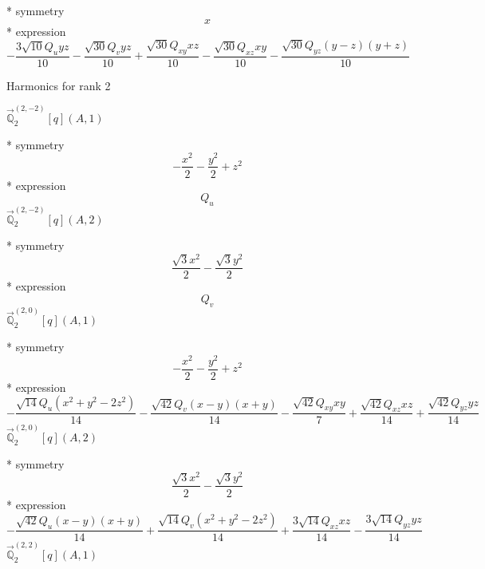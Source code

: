 \documentclass[fleqn,8pt]{jsarticle}
\begin{document}
\noindent\quad ** symmetry
\begin{dmath*}
x
\end{dmath*}
\noindent\quad ** expression
\begin{dmath*}
- \frac{3 \sqrt{10} Q_{u} y z}{10} - \frac{\sqrt{30} Q_{v} y z}{10} + \frac{\sqrt{30} Q_{xy} x z}{10} - \frac{\sqrt{30} Q_{xz} x y}{10} - \frac{\sqrt{30} Q_{yz} \left(y - z\right) \left(y + z\right)}{10}
\end{dmath*}

\noindent * Harmonics for rank 2

\noindent\quad $\vec{\mathbb{Q}}_{2}^{(2,-2)}[q](A,1)$

\noindent\quad ** symmetry
\begin{dmath*}
- \frac{x^{2}}{2} - \frac{y^{2}}{2} + z^{2}
\end{dmath*}
\noindent\quad ** expression
\begin{dmath*}
Q_{u}
\end{dmath*}
\noindent\quad $\vec{\mathbb{Q}}_{2}^{(2,-2)}[q](A,2)$

\noindent\quad ** symmetry
\begin{dmath*}
\frac{\sqrt{3} x^{2}}{2} - \frac{\sqrt{3} y^{2}}{2}
\end{dmath*}
\noindent\quad ** expression
\begin{dmath*}
Q_{v}
\end{dmath*}
\noindent\quad $\vec{\mathbb{Q}}_{2}^{(2,0)}[q](A,1)$

\noindent\quad ** symmetry
\begin{dmath*}
- \frac{x^{2}}{2} - \frac{y^{2}}{2} + z^{2}
\end{dmath*}
\noindent\quad ** expression
\begin{dmath*}
- \frac{\sqrt{14} Q_{u} \left(x^{2} + y^{2} - 2 z^{2}\right)}{14} - \frac{\sqrt{42} Q_{v} \left(x - y\right) \left(x + y\right)}{14} - \frac{\sqrt{42} Q_{xy} x y}{7} + \frac{\sqrt{42} Q_{xz} x z}{14} + \frac{\sqrt{42} Q_{yz} y z}{14}
\end{dmath*}
\noindent\quad $\vec{\mathbb{Q}}_{2}^{(2,0)}[q](A,2)$

\noindent\quad ** symmetry
\begin{dmath*}
\frac{\sqrt{3} x^{2}}{2} - \frac{\sqrt{3} y^{2}}{2}
\end{dmath*}
\noindent\quad ** expression
\begin{dmath*}
- \frac{\sqrt{42} Q_{u} \left(x - y\right) \left(x + y\right)}{14} + \frac{\sqrt{14} Q_{v} \left(x^{2} + y^{2} - 2 z^{2}\right)}{14} + \frac{3 \sqrt{14} Q_{xz} x z}{14} - \frac{3 \sqrt{14} Q_{yz} y z}{14}
\end{dmath*}
\noindent\quad $\vec{\mathbb{Q}}_{2}^{(2,2)}[q](A,1)$
\end{document}
